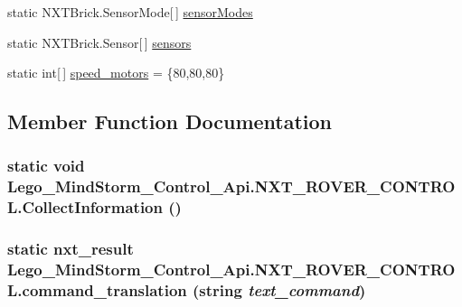 \begin{CompactItemize}
\item 
static NXTBrick.SensorMode\mbox{[}$\,$\mbox{]} \hyperlink{class_lego___mind_storm___control___api_1_1_n_x_t___r_o_v_e_r___c_o_n_t_r_o_l_6306b75573ca70bd6e793ccbf97200a5}{sensorModes}
\item 
static NXTBrick.Sensor\mbox{[}$\,$\mbox{]} \hyperlink{class_lego___mind_storm___control___api_1_1_n_x_t___r_o_v_e_r___c_o_n_t_r_o_l_6e8d4fa3f89e2b26a588297d6442e96c}{sensors}
\item 
static int\mbox{[}$\,$\mbox{]} \hyperlink{class_lego___mind_storm___control___api_1_1_n_x_t___r_o_v_e_r___c_o_n_t_r_o_l_c3a7b949d40838384197e2a9c431238d}{speed\_\-motors} = \{80,80,80\}
\end{CompactItemize}


\subsection{Member Function Documentation}
\hypertarget{class_lego___mind_storm___control___api_1_1_n_x_t___r_o_v_e_r___c_o_n_t_r_o_l_85a22d5ba990c5486bac8dc13da5d7c0}{
\subsubsection[{CollectInformation}]{\setlength{\rightskip}{0pt plus 5cm}static void Lego\_\-MindStorm\_\-Control\_\-Api.NXT\_\-ROVER\_\-CONTROL.CollectInformation ()}}
\label{class_lego___mind_storm___control___api_1_1_n_x_t___r_o_v_e_r___c_o_n_t_r_o_l_85a22d5ba990c5486bac8dc13da5d7c0}


\hypertarget{class_lego___mind_storm___control___api_1_1_n_x_t___r_o_v_e_r___c_o_n_t_r_o_l_c343c6e5c1b03ad7632bccc27f25cd92}{
\subsubsection[{command\_\-translation}]{\setlength{\rightskip}{0pt plus 5cm}static {\bf nxt\_\-result} Lego\_\-MindStorm\_\-Control\_\-Api.NXT\_\-ROVER\_\-CONTROL.command\_\-translation (string {\em text\_\-command})}}
\label{class_lego___mind_storm___control___api_1_1_n_x_t___r_o_v_e_r___c_o_n_t_r_o_l_c343c6e5c1b03ad7632bccc27f25cd92}


